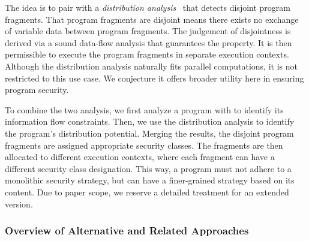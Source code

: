 The idea is to pair \lname with a \emph{distribution analysis}~\cite{aubert20232} that detects disjoint program fragments.
That program fragments are disjoint means there exists no exchange of variable data between program fragments.
The judgement of disjointness is derived via a sound data-flow analysis that guarantees the property.
It is then permissible to execute the program fragments in separate execution contexts.
Although the distribution analysis naturally fits parallel computations, it is not restricted to this use case.
We conjecture it offers broader utility here in ensuring program security.

To combine the two analysis, we first analyze a program with \lname to identify its information flow constraints.
Then, we use the distribution analysis to identify the program's distribution potential.
Merging the results, the disjoint program fragments are assigned appropriate security classes.
The fragments are then allocated to different execution contexts, where each fragment can have a different security class designation.
This way, a program must not adhere to a monolithic security strategy, but can have a finer-grained strategy based on its content.
Due to paper scope, we reserve a detailed treatment for an extended version.


\subsubsection{Overview of Alternative and Related Approaches}\label{sec:related-works}

